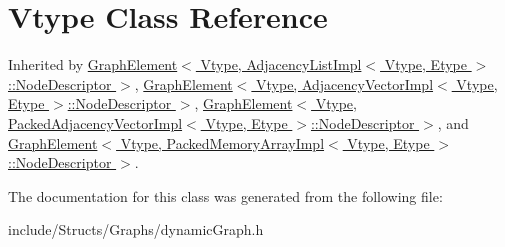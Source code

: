 \hypertarget{class_vtype}{
\section{Vtype Class Reference}
\label{class_vtype}
}


Inherited by \hyperlink{class_graph_element}{GraphElement$<$ Vtype, AdjacencyListImpl$<$ Vtype, Etype $>$::NodeDescriptor $>$}, \hyperlink{class_graph_element}{GraphElement$<$ Vtype, AdjacencyVectorImpl$<$ Vtype, Etype $>$::NodeDescriptor $>$}, \hyperlink{class_graph_element}{GraphElement$<$ Vtype, PackedAdjacencyVectorImpl$<$ Vtype, Etype $>$::NodeDescriptor $>$}, and \hyperlink{class_graph_element}{GraphElement$<$ Vtype, PackedMemoryArrayImpl$<$ Vtype, Etype $>$::NodeDescriptor $>$}.



The documentation for this class was generated from the following file:\begin{DoxyCompactItemize}
\item 
include/Structs/Graphs/dynamicGraph.h\end{DoxyCompactItemize}
